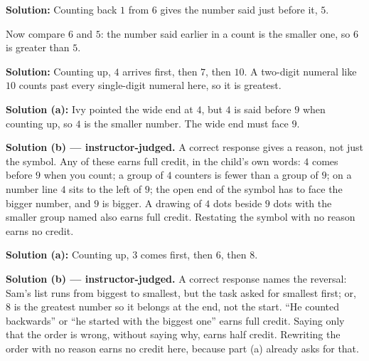 \documentclass[12pt]{article}
\begin{document}

\textbf{Solution:} Counting back $1$ from $6$ gives the number said just before it, $5$. 

Now compare $6$ and $5$: the number said earlier in a count is the smaller one, so $6$ is greater than $5$. 


\textbf{Solution:} Counting up, $4$ arrives first, then $7$, then $10$. A two-digit numeral like $10$ counts past every single-digit numeral here, so it is greatest. 


\textbf{Solution (a):} Ivy pointed the wide end at $4$, but $4$ is said before $9$ when counting up, so $4$ is the smaller number. The wide end must face $9$. 

\textbf{Solution (b) --- instructor-judged.} A correct response gives a reason, not just the symbol. Any of these earns full credit, in the child's own words: $4$ comes before $9$ when you count; a group of $4$ counters is fewer than a group of $9$; on a number line $4$ sits to the left of $9$; the open end of the symbol has to face the bigger number, and $9$ is bigger. A drawing of $4$ dots beside $9$ dots with the smaller group named also earns full credit. Restating the symbol with no reason earns no credit.


\textbf{Solution (a):} Counting up, $3$ comes first, then $6$, then $8$. 

\textbf{Solution (b) --- instructor-judged.} A correct response names the reversal: Sam's list runs from biggest to smallest, but the task asked for smallest first; or, $8$ is the greatest number so it belongs at the end, not the start. ``He counted backwards'' or ``he started with the biggest one'' earns full credit. Saying only that the order is wrong, without saying why, earns half credit. Rewriting the order with no reason earns no credit here, because part (a) already asks for that.
\end{document}

